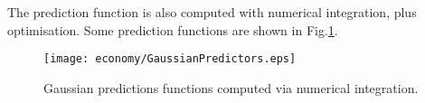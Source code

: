 The prediction function is also computed with numerical integration, plus optimisation.
Some prediction functions are shown in Fig.\ref{GaussianPredictions}.

\begin{figure}[!htbp]
	\begin{center}
	\texttt{[image: economy/GaussianPredictors.eps]}
	\end{center}
	\caption[Gaussian prediction function]{Gaussian predictions functions computed via numerical integration.
	}
	\label{GaussianPredictions}
\end{figure}

